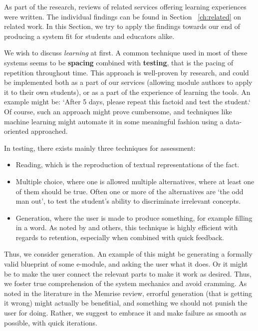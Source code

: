 As part of the research, reviews of related services offering learning
experiences were written. The individual findings can be found in Section
~\ref{ch:related} on related work. In this Section, we try to apply the
findings towards our end of producing a system fit for students and educators 
alike.

We wish to discuss \textit{learning} at first. A common technique used in most
of these systems seems to be \textbf{spacing} combined with \textbf{testing},
that is the pacing of repetition throughout time. This approach is well-proven
by research, and could be implemented both as a part of our services (allowing
module authors to apply it to their own students), or as a part of the
experience of learning the tools. An example might be: `After 5 days, please
repeat this factoid and test the student.` Of course, such an approach might
prove cumbersome, and techniques like machine learning might automate it in some
meaningful fashion using a data-oriented approached.

In testing, there exists mainly three techniques for assessment:

\begin{itemize}
\item Reading, which is the reproduction of textual representations of the fact.
\item Multiple choice, where one is allowed multiple alternatives, where at
least one of them should be true. Often one or more of the alternatives are `the
odd man out', to test the student's ability to discriminate irrelevant concepts.
\item Generation, where the user is made to produce something, for example
filling in a word. As noted by \cite{potts2014benefit} and others, this
technique is highly efficient with regards to retention, especially when
combined with quick feedback.
\end{itemize}

Thus, we consider generation. An example of this might be generating a formally
valid blueprint of some e-module, and asking the user what it does. Or it might
be to make the user connect the relevant parts to make it work as desired. Thus,
we foster true comprehension of the system mechanics and avoid cramming. As
noted in the literature in the Memrise review, errorful generation (that is
getting it wrong) might actually be benefitial, and something we should not
punish the user for doing. Rather, we suggest to embrace it and make failure as
smooth as possible, with quick iterations.

